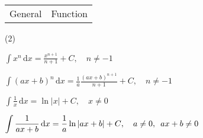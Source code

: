 \documentclass[11pt,a4paper]{book}
\begin{document}
\begin{tcolorbox}[colback=blue!5, colframe=black, boxrule=.4pt, sharpish corners]

\begin{tabular}{>{\centering}p{4.5cm}>{\centering}p{10cm}}
General & Function\tabularnewline
\end{tabular}

\begin{tasks}[style=itemize,label-width=3.5ex,column-sep=-3cm](2)

\task ${\displaystyle \int x^{n}\, \mathrm{d}x=\frac{x^{n+1}}{n+1}+C,\quad n\ne-1}$

\task ${\displaystyle \int(ax+b)^{n}\, \mathrm{d}x=\frac{1}{a}\frac{(ax+b)^{n+1}}{n+1}+C,\quad n\ne-1}$

\task ${\displaystyle \int\frac{1}{x}\, \mathrm{d}x=\ln\left|x\right|+C,\quad x\ne0}$

\task ${\displaystyle \int\frac{1}{ax+b}\, \mathrm{d}x=\frac{1}{a}\ln\left|ax+b\right|+C},\quad a\ne0,\enskip ax+b\ne0$

\end{tasks}
\end{tcolorbox}
\end{document}
